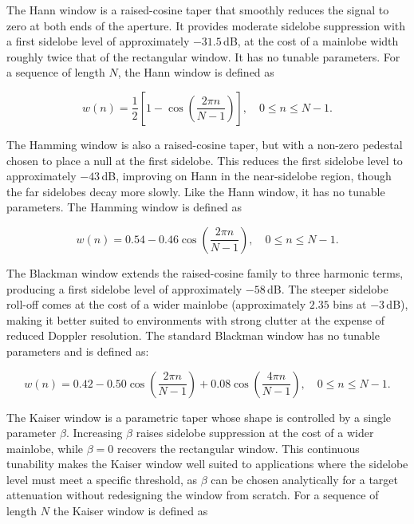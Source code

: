 The Hann window is a raised-cosine taper that smoothly reduces the signal to zero at both ends
of the aperture. It provides moderate sidelobe suppression with a first sidelobe level of
approximately $-31.5$\,dB, at the cost of a mainlobe width roughly twice that of the rectangular
window. It has no tunable parameters. For a sequence of length $N$, the Hann window is defined as

\begin{equation}
    w(n) = \frac{1}{2}\left[1 - \cos\!\left(\frac{2\pi n}{N-1}\right)\right], \quad 0 \le n \le N-1.
    \label{eq:hann}
\end{equation}

The Hamming window is also a raised-cosine taper, but with a non-zero pedestal chosen to place a
null at the first sidelobe. This reduces the first sidelobe level to approximately $-43$\,dB,
improving on Hann in the near-sidelobe region, though the far sidelobes decay more slowly. Like
the Hann window, it has no tunable parameters. The Hamming window is defined as

\begin{equation}
    w(n) = 0.54 - 0.46\cos\!\left(\frac{2\pi n}{N-1}\right), \quad 0 \le n \le N-1.
    \label{eq:hamming}
\end{equation}

The Blackman window extends the raised-cosine family to three harmonic terms, producing a first
sidelobe level of approximately $-58$\,dB. The steeper sidelobe roll-off comes at the cost of a
wider mainlobe (approximately $2.35$ bins at $-3$\,dB), making it better suited to environments
with strong clutter at the expense of reduced Doppler resolution. The standard Blackman window has
no tunable parameters and is defined as:

\begin{equation}
    w(n) = 0.42 - 0.50\cos\!\left(\frac{2\pi n}{N-1}\right)
               + 0.08\cos\!\left(\frac{4\pi n}{N-1}\right), \quad 0 \le n \le N-1.
    \label{eq:blackman}
\end{equation}

The Kaiser window is a parametric taper whose shape is controlled by a single
parameter $\beta$. Increasing $\beta$ raises sidelobe suppression at the cost of
a wider mainlobe, while $\beta = 0$ recovers the rectangular window. This
continuous tunability makes the Kaiser window well suited to applications where
the sidelobe level must meet a specific threshold, as $\beta$ can be chosen
analytically for a target attenuation without redesigning the window from scratch.
For a sequence of length $N$ the Kaiser window is defined as

